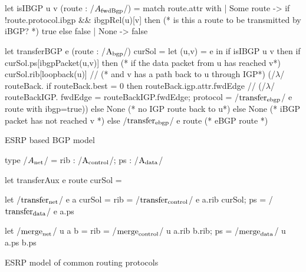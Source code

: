 \documentclass[sigconf,10pt]{acmart}
\begin{document}
\begin{listing}[ht]
\begin{ocamlcode}
  let isIBGP u v (route : /$A_{\fbgp}$/) =
    match route.attr with
    | Some route ->
      if !route.protocol.ibgp && ibgpRel(u)[v] then (* is this a route to be transmitted by iBGP? *)
        true
      else
        false
    | None -> false
        
  let transferBGP e (route : /$\A_{\bgp}$/) curSol =
  let (u,v) = e  in
  if isIBGP u v then
    if curSol.ps[ibgpPacket(u,v)] then (* if the data packet from u has reached v*)
      curSol.rib[loopback(u)] /\bind/ (* and v has a path back to u through IGP*)
        (/$\lambda$/ routeBack. 
          if routeBack.best = 0 then
            routeBack.igp.attr.fwdEdge /\bind/
              (/$\lambda$/ routeBackIGP.
                { fwdEdge = routeBackIGP.fwdEdge;
                  protocol = /$\transfer_{\ebgp}$/ e {route with ibgp=true}}))
          else None (* no IGP route back to u*)
    else
       None (* iBGP packet has not reached v *)
  else
    /$\transfer_{\ebgp}$/ e route (* eBGP route *)
  \end{ocamlcode}
  \caption{ESRP based BGP model}
  \label{lst:ibgp-alternative-model}
\end{listing}

\begin{listing}[ht]
  \begin{ocamlcode}
    type /$A_{\net}$/ = { rib : /$\A_{\control}$/; ps : /$\A_{\data}$/ }

    let  transferAux e route curSol =
    
    let /$\transfer_{\net}$/ e a curSol =
      { rib = /$\transfer_{\control}$/ e a.rib curSol;
        ps = /$\transfer_{\data}$/ e a.ps
      }
            
    let /$\merge_{\net}$/ u a b =
      {rib = /$\merge_{\control}$/ u a.rib b.rib; ps = /$\merge_{\data}$/ u a.ps b.ps}
\end{ocamlcode}
\caption{ESRP model of common routing protocols}
\label{lst:esrp-model}
\end{listing}
\end{document}
